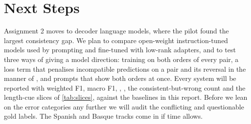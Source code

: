 \section{Next Steps}
\label{sec:next}

Assignment 2 moves to decoder language models, where the pilot found the largest consistency gap. We plan to compare open-weight instruction-tuned models used by prompting and fine-tuned with low-rank adapters, and to test three ways of giving a model direction: training on both orders of every pair, a loss term that penalises incompatible predictions on a pair and its reversal in the manner of \citet{li-etal-2019-logic}, and prompts that show both orders at once. Every system will be reported with weighted F1, macro F1, \SoftCons{}, \HardCons{}, the consistent-but-wrong count and the length-cue slices of \cref{tab:slices}, against the baselines in this report. Before we lean on the error categories any further we will audit the conflicting and questionable gold labels. The Spanish and Basque tracks come in if time allows.
